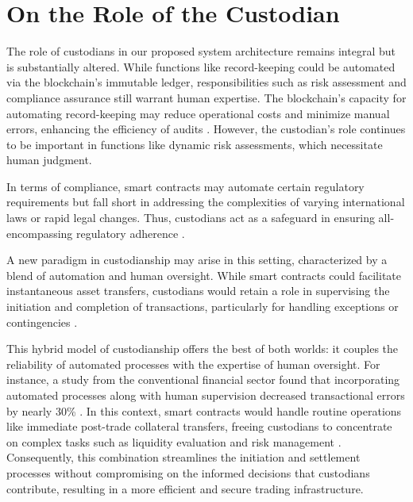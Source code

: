 \section{On the Role of the Custodian}
\label{sec:custodian}
The role of custodians in our proposed system architecture remains integral but is substantially altered. While functions like record-keeping could be automated via the blockchain's immutable ledger, responsibilities such as risk assessment and compliance assurance still warrant human expertise. The blockchain's capacity for automating record-keeping may reduce operational costs and minimize manual errors, enhancing the efficiency of audits \citep{DTCC}. However, the custodian's role continues to be important in functions like dynamic risk assessments, which necessitate human judgment.

In terms of compliance, smart contracts may automate certain regulatory requirements but fall short in addressing the complexities of varying international laws or rapid legal changes. Thus, custodians act as a safeguard in ensuring all-encompassing regulatory adherence \citep{Thomson_Reuters}.

A new paradigm in custodianship may arise in this setting, characterized by a blend of automation and human oversight. While smart contracts could facilitate instantaneous asset transfers, custodians would retain a role in supervising the initiation and completion of transactions, particularly for handling exceptions or contingencies \citep{isda_transparency}.

This hybrid model of custodianship offers the best of both worlds: it couples the reliability of automated processes with the expertise of human oversight. For instance, a study from the conventional financial sector found that incorporating automated processes along with human supervision decreased transactional errors by nearly 30\% \citep{accenture}. In this context, smart contracts would handle routine operations like immediate post-trade collateral transfers, freeing custodians to concentrate on complex tasks such as liquidity evaluation and risk management \citep{deloitte_costs}. Consequently, this combination streamlines the initiation and settlement processes without compromising on the informed decisions that custodians contribute, resulting in a more efficient and secure trading infrastructure.